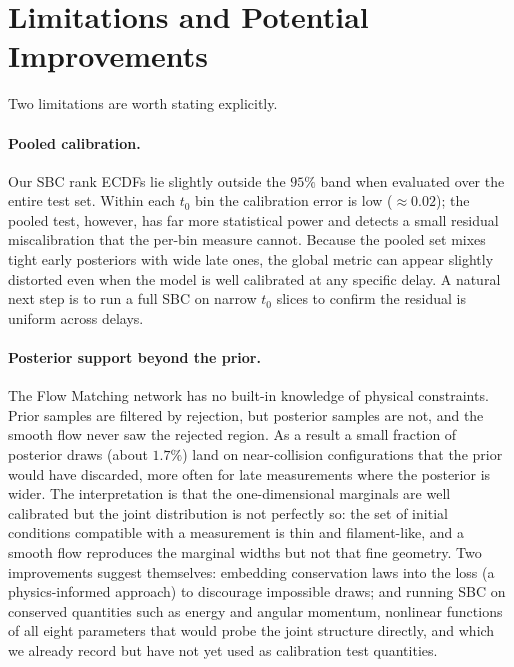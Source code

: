 \documentclass[12pt]{article}
\begin{document}
\section{Limitations and Potential Improvements}
Two limitations are worth stating explicitly.
 
\paragraph{Pooled calibration.} Our SBC rank ECDFs lie slightly outside the $95\%$ band when evaluated
over the entire test set. Within each $t_0$ bin the calibration error is low ($\approx 0.02$); the
pooled test, however, has far more statistical power and detects a small residual miscalibration that
the per-bin measure cannot. Because the pooled set mixes tight early posteriors with wide late ones, the
global metric can appear slightly distorted even when the model is well calibrated at any specific delay.
A natural next step is to run a full SBC on narrow $t_0$ slices to confirm the residual is uniform across
delays.
 
\paragraph{Posterior support beyond the prior.} The Flow Matching network has no built-in knowledge of
physical constraints. Prior samples are filtered by rejection, but posterior samples are not, and the
smooth flow never saw the rejected region. As a result a small fraction of posterior draws (about
$1.7\%$) land on near-collision configurations that the prior would have discarded, more often for late
measurements where the posterior is wider. The interpretation is that the one-dimensional marginals are
well calibrated but the joint distribution is not perfectly so: the set of initial conditions compatible
with a measurement is thin and filament-like, and a smooth flow reproduces the marginal widths but not
that fine geometry. Two improvements suggest themselves: embedding conservation laws into the loss (a
physics-informed approach) to discourage impossible draws; and running SBC on conserved quantities such
as energy and angular momentum, nonlinear functions of all eight parameters that would probe the joint
structure directly, and which we already record but have not yet used as calibration test quantities.
 
\end{document}
